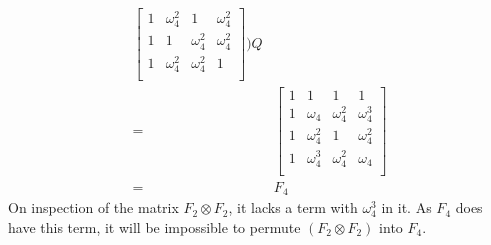 \documentclass{assignment}
\begin{document}
\begin{problemlist}
\begin{answer}
\begin{enumerate}
\begin{align*}
\begin{bmatrix}
          1 & \omega_4^2 & 1 & \omega_4^2\\
          1 & 1 & \omega_4^2 & \omega_4^2\\
          1 & \omega_4^2 & \omega_4^2 & 1\\
        \end{bmatrix}
        )Q\\
        =&\begin{bmatrix}
          1 & 1 & 1 & 1\\
          1 & \omega_4 & \omega_4^2 & \omega_4^3\\
          1 & \omega_4^2 & 1 & \omega_4^2\\
          1 & \omega_4^3 & \omega_4^2 & \omega_4\\
        \end{bmatrix}\\
        =&F_4        
      \end{align*}
      On inspection of the matrix $F_2\otimes F_2$, it lacks a term with $\omega_4^3$ in it. As $F_4$ does have this term, it will be impossible to permute $(F_2\otimes F_2)$ into $F_4$.\\
    \end{enumerate}
  \end{answer}


\end{problemlist}
\end{document}
